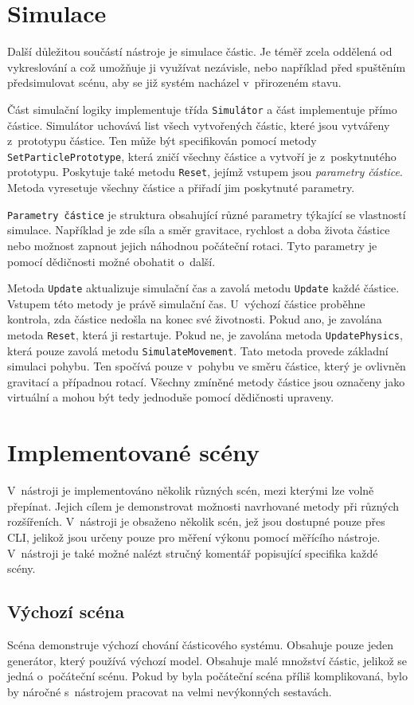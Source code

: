 \section{Simulace}
Další důležitou součástí nástroje je simulace částic. Je téměř zcela oddělená od vykreslování a což umožňuje ji využívat nezávisle, nebo například před spuštěním předsimulovat scénu, aby se již systém nacházel v~přirozeném stavu. 

Část simulační logiky implementuje třída \texttt{Simulátor} a část implementuje přímo částice. Simulátor uchovává list všech vytvořených částic, které jsou vytvářeny z~prototypu částice. Ten může být specifikován pomocí metody \texttt{SetParticlePrototype}, která zničí všechny částice a vytvoří je z~poskytnutého prototypu. Poskytuje také metodu \texttt{Reset}, jejímž vstupem jsou \emph{parametry částice}. Metoda vyresetuje všechny částice a přiřadí jim poskytnuté parametry. 

\texttt{Parametry částice} je struktura obsahující různé parametry týkající se vlastností simulace. Například je zde síla a směr gravitace, rychlost a doba života částice nebo možnost zapnout jejich náhodnou počáteční rotaci. Tyto parametry je pomocí dědičnosti možné obohatit o~další. 

Metoda \texttt{Update} aktualizuje simulační čas a zavolá metodu \texttt{Update} každé částice. Vstupem této metody je právě simulační čas. U~výchozí částice proběhne kontrola, zda částice nedošla na konec své životnosti. Pokud ano, je zavolána metoda \texttt{Reset}, která ji restartuje. Pokud ne, je zavolána metoda \texttt{UpdatePhysics}, která pouze zavolá metodu  \texttt{SimulateMovement}. Tato metoda provede základní simulaci pohybu. Ten spočívá pouze v~pohybu ve směru částice, který je ovlivněn gravitací a případnou rotací. Všechny zmíněné metody částice jsou označeny jako virtuální a mohou být tedy jednoduše pomocí dědičnosti upraveny.

\section{Implementované scény}
V~nástroji je implementováno několik různých scén, mezi kterými lze volně přepínat. Jejich cílem je demonstrovat možnosti navrhované metody při různých rozšířeních. V~nástroji je obsaženo několik scén, jež jsou dostupné pouze přes CLI, jelikož jsou určeny pouze pro měření výkonu pomocí měřícího nástroje. V~nástroji je také možné nalézt stručný komentář popisující specifika každé scény.
\subsection*{Výchozí scéna}
Scéna demonstruje výchozí chování částicového systému. Obsahuje pouze jeden generátor, který používá výchozí model. Obsahuje malé množství částic, jelikož se jedná o~počáteční scénu. Pokud by byla počáteční scéna příliš komplikovaná, bylo by náročné s~nástrojem pracovat na velmi nevýkonných sestavách. 
